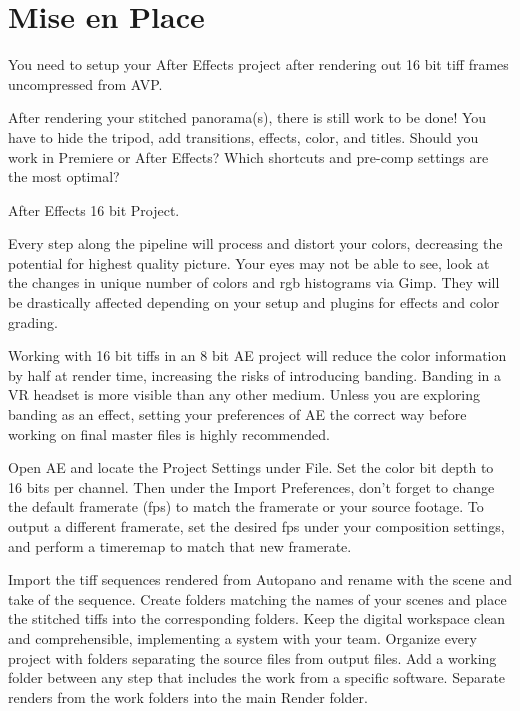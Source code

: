 \chapter{Mise en Place}
\pagecolor{white}
\label{chap:47}
\begin{fullwidth}

\problem

{\large You need to setup your After Effects project after rendering out 16 bit tiff frames uncompressed from AVP. \par}

After rendering your stitched panorama(s), there is still work to be done! You have to hide the tripod, add transitions, effects, color, and titles. Should you work in Premiere or After Effects? Which shortcuts and pre-comp settings are the most optimal?

\solutions

{\large After Effects 16 bit Project. \par}

Every step along the pipeline will process and distort your colors, decreasing the potential for highest quality picture. Your eyes may not be able to see, look at the changes in unique number of colors and rgb histograms via Gimp. They will be drastically affected depending on your setup and plugins for effects and color grading.


Working with 16 bit tiffs in an 8 bit AE project will reduce the color information by half at render time, increasing the risks of introducing banding. Banding in a VR headset is more visible than any other medium. Unless you are exploring banding as an effect, setting your preferences of AE the correct way before working on final master files is highly recommended. 

Open AE and locate the Project Settings under File. Set the color bit depth to 16 bits per channel. Then under the Import Preferences, don't forget to change the default framerate (fps) to match the framerate or your source footage. To output a different framerate, set the desired fps under your composition settings, and perform a timeremap to match that new framerate.


Import the tiff sequences rendered from Autopano and rename with the scene and take of the sequence. Create folders matching the names of your scenes and place the stitched tiffs into the corresponding folders. Keep the digital workspace clean and comprehensible, implementing a system with your team. Organize every project with folders separating the source files from output files. Add a working folder between any step that includes the work from a specific software. Separate renders from the work folders into the main Render folder. 


\end{fullwidth}
